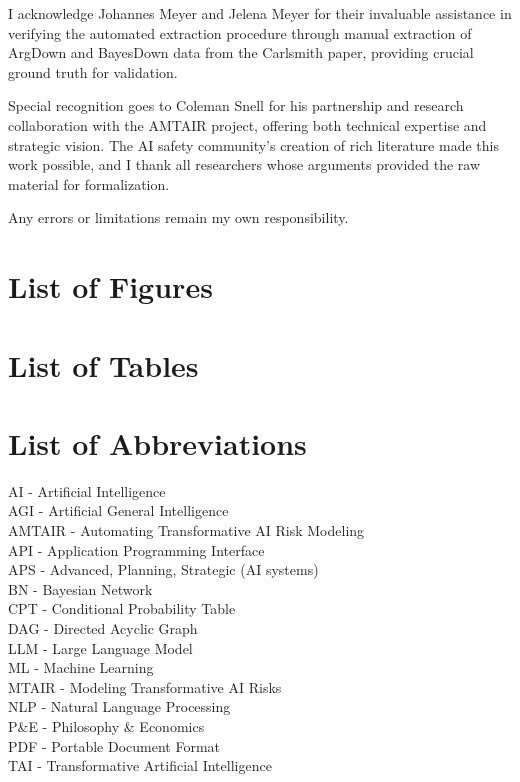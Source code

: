 \documentclass[
  11pt,
  letterpaper,
]{book}
\begin{document}
I acknowledge Johannes Meyer and Jelena Meyer for their invaluable
assistance in verifying the automated extraction procedure through
manual extraction of ArgDown and BayesDown data from the Carlsmith
paper, providing crucial ground truth for validation.

Special recognition goes to Coleman Snell for his partnership and
research collaboration with the AMTAIR project, offering both technical
expertise and strategic vision. The AI safety community's creation of
rich literature made this work possible, and I thank all researchers
whose arguments provided the raw material for formalization.

Any errors or limitations remain my own responsibility.

\section{List of Figures}\label{list-of-figures}

\section{List of Tables}\label{list-of-tables}

\section{List of Abbreviations}\label{list-of-abbreviations}

AI - Artificial Intelligence\\
AGI - Artificial General Intelligence\\
AMTAIR - Automating Transformative AI Risk Modeling\\
API - Application Programming Interface\\
APS - Advanced, Planning, Strategic (AI systems)\\
BN - Bayesian Network\\
CPT - Conditional Probability Table\\
DAG - Directed Acyclic Graph\\
LLM - Large Language Model\\
ML - Machine Learning\\
MTAIR - Modeling Transformative AI Risks\\
NLP - Natural Language Processing\\
P\&E - Philosophy \& Economics\\
PDF - Portable Document Format\\
TAI - Transformative Artificial Intelligence
\end{document}
